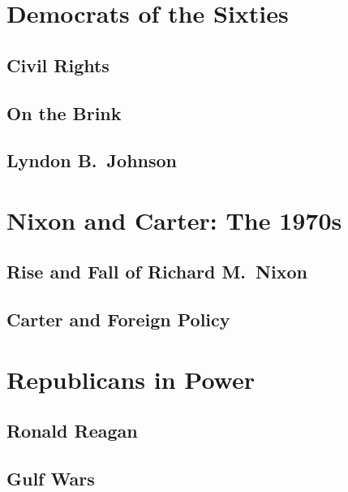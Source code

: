 \section{Democrats of the Sixties}

\subsection*{Civil Rights}

\subsection*{On the Brink}

\subsection*{Lyndon B.\ Johnson}

\section{Nixon and Carter: The 1970s}

\subsection*{Rise and Fall of Richard M.\ Nixon}

\subsection*{Carter and Foreign Policy}

\section{Republicans in Power}

\subsection*{Ronald Reagan}

\subsection*{Gulf Wars}
